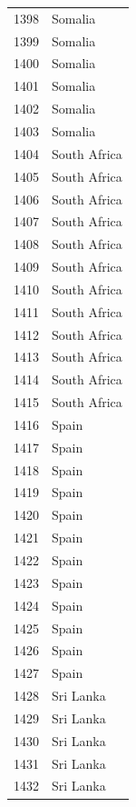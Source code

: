 \documentclass[
  letterpaper,
  DIV=11,
  numbers=noendperiod]{scrreprt}
\begin{document}
\begin{tabular}{ll}
1398 &                   Somalia \\
1399 &                   Somalia \\
1400 &                   Somalia \\
1401 &                   Somalia \\
1402 &                   Somalia \\
1403 &                   Somalia \\
1404 &              South Africa \\
1405 &              South Africa \\
1406 &              South Africa \\
1407 &              South Africa \\
1408 &              South Africa \\
1409 &              South Africa \\
1410 &              South Africa \\
1411 &              South Africa \\
1412 &              South Africa \\
1413 &              South Africa \\
1414 &              South Africa \\
1415 &              South Africa \\
1416 &                     Spain \\
1417 &                     Spain \\
1418 &                     Spain \\
1419 &                     Spain \\
1420 &                     Spain \\
1421 &                     Spain \\
1422 &                     Spain \\
1423 &                     Spain \\
1424 &                     Spain \\
1425 &                     Spain \\
1426 &                     Spain \\
1427 &                     Spain \\
1428 &                 Sri Lanka \\
1429 &                 Sri Lanka \\
1430 &                 Sri Lanka \\
1431 &                 Sri Lanka \\
1432 &                 Sri Lanka \\

\end{tabular}
\end{document}

